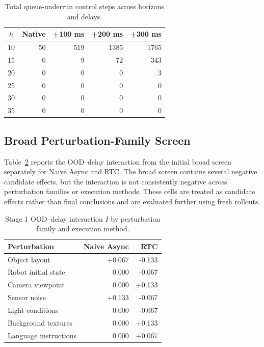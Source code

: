\documentclass{article}
\begin{document}
\begin{table}[h]
\centering
\small
\caption{Total queue-underrun control steps across horizons and delays.}
\label{tab:full_underruns}
\begin{tabular}{c|rrrr}
\hline
\(h\) & Native & +100 ms & +200 ms & +300 ms \\
\hline
10 & 50 & 519 & 1385 & 1765 \\
15 & 0 & 9 & 72 & 343 \\
20 & 0 & 0 & 0 & 3 \\
25 & 0 & 0 & 0 & 0 \\
30 & 0 & 0 & 0 & 0 \\
35 & 0 & 0 & 0 & 0 \\
\hline
\end{tabular}
\end{table}

\subsection{Broad Perturbation-Family Screen}

Table~\ref{tab:perturbation_full} reports the OOD--delay interaction from the initial broad screen separately for Naive Async and RTC. The broad screen contains several negative candidate effects, but the interaction is not consistently negative across perturbation families or execution methods. These cells are treated as candidate effects rather than final conclusions and are evaluated further using fresh rollouts.

\begin{table}[h]
\centering
\small
\caption{Stage 1 OOD--delay interaction \(I\) by perturbation family and execution method.}
\label{tab:perturbation_full}
\begin{tabular}{l|rr}
\hline
Perturbation & Naive Async & RTC \\
\hline
Object layout & +0.067 & -0.133 \\
Robot initial state & 0.000 & -0.067 \\
Camera viewpoint & 0.000 & +0.133 \\
Sensor noise & +0.133 & -0.067 \\
Light conditions & 0.000 & -0.067 \\
Background textures & 0.000 & +0.133 \\
Language instructions & 0.000 & +0.067 \\
\hline
\end{tabular}
\end{table}
\end{document}
